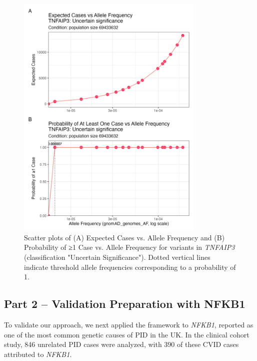 \documentclass[a4paper,12pt]{article}
\begin{document}
\begin{figure}[H]
  \centering
  \includegraphics[width=0.8\textwidth]{../images/tnfaip3_scatter_expected_prob.png}
  \caption{Scatter plots of (A) Expected Cases vs. Allele Frequency and (B) Probability of ≥1 Case vs. Allele Frequency for variants in \textit{TNFAIP3} (classification "Uncertain Significance"). Dotted vertical lines indicate threshold allele frequencies corresponding to a probability of 1.}
  \label{fig:tnfaip3_scatter_expected_prob}
\end{figure}

\subsection{Part 2 -- Validation Preparation with NFKB1}
To validate our approach, we next applied the framework to \textit{NFKB1}, reported as one of the most common genetic causes of PID in the UK. In the clinical cohort study, 846 unrelated PID cases were analyzed, with 390 of these CVID cases attributed to \textit{NFKB1}. 
\end{document}

